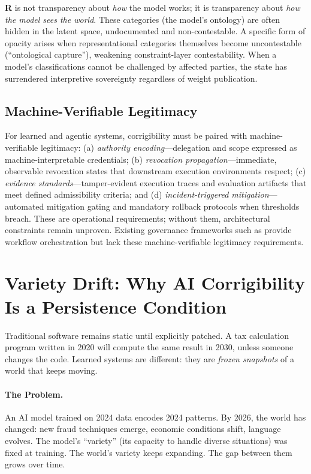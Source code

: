 \documentclass[11pt,a4paper]{article}
\theoremstyle{definition}
\begin{document}
\textbf{R} is not transparency about \textit{how} the model works; it is transparency about \textit{how the model sees the world}. These categories (the model's ontology) are often hidden in the latent space, undocumented and non-contestable. A specific form of opacity arises when representational categories themselves become uncontestable (``ontological capture''), weakening constraint-layer contestability. When a model's classifications cannot be challenged by affected parties, the state has surrendered interpretive sovereignty regardless of weight publication.

\subsection{Machine-Verifiable Legitimacy}
\label{subsec:machine-verifiable}

For learned and agentic systems, corrigibility must be paired with machine-verifiable legitimacy: (a) \textit{authority encoding}---delegation and scope expressed as machine-interpretable credentials; (b) \textit{revocation propagation}---immediate, observable revocation states that downstream execution environments respect; (c) \textit{evidence standards}---tamper-evident execution traces and evaluation artifacts that meet defined admissibility criteria; and (d) \textit{incident-triggered mitigation}---automated mitigation gating and mandatory rollback protocols when thresholds breach. These are operational requirements; without them, architectural constraints remain unproven. Existing governance frameworks such as \citep{abadie2026} provide workflow orchestration but lack these machine-verifiable legitimacy requirements.


\section{Variety Drift: Why AI Corrigibility Is a Persistence Condition}
\label{sec:temporal}

Traditional software remains static until explicitly patched. A tax calculation program written in 2020 will compute the same result in 2030, unless someone changes the code. Learned systems are different: they are \textit{frozen snapshots} of a world that keeps moving.

\paragraph{The Problem.} An AI model trained on 2024 data encodes 2024 patterns. By 2026, the world has changed: new fraud techniques emerge, economic conditions shift, language evolves. The model's ``variety'' (its capacity to handle diverse situations) was fixed at training. The world's variety keeps expanding. The gap between them grows over time.
\end{document}
